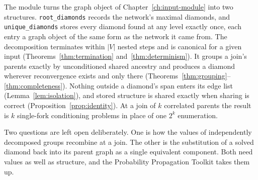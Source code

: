 \documentclass[12pt]{report}
\begin{document}
The module turns the graph object of Chapter~\ref{ch:input-module} into two structures. \texttt{root\_diamonds} records the network's maximal diamonds, and \texttt{unique\_diamonds} stores every diamond found at any level exactly once, each entry a graph object of the same form as the network it came from. The decomposition terminates within $|V|$ nested steps and is canonical for a given input (Theorems~\ref{thm:termination} and~\ref{thm:determinism}). It groups a join's parents exactly by unconditioned shared ancestry and produces a diamond wherever reconvergence exists and only there (Theorems~\ref{thm:grouping}--\ref{thm:completeness}). Nothing outside a diamond's span enters its edge list (Lemma~\ref{lem:isolation}), and stored structure is shared exactly when sharing is correct (Proposition~\ref{prop:identity}). At a join of $k$ correlated parents the result is $k$ single-fork conditioning problems in place of one $2^{k}$ enumeration.

Two questions are left open deliberately. One is how the values of independently decomposed groups recombine at a join. The other is the substitution of a solved diamond back into its parent graph as a single equivalent component. Both need values as well as structure, and the Probability Propagation Toolkit takes them up.

\ifdefined\maindoc
\else
\printbibliography
\end{document}
